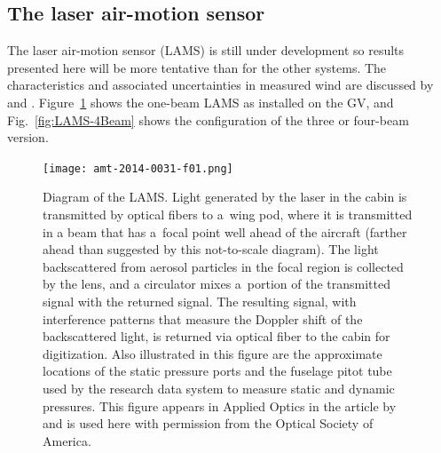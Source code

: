 \documentclass[12pt,twoside,english]{article}\usepackage[]{graphicx}\usepackage[]{color}
\let\OrgIndex\index
\renewcommand*{\index}[1]{\OrgIndex{#1}}
\begin{document}
\subsection{The laser air-motion sensor\label{sub:LAMS-description}}

The laser air-motion sensor (LAMS) is still under development so results presented here will be more tentative than for the other systems. The characteristics and associated uncertainties in measured wind are discussed by \citet{SpulerEtAl2011} and \citet{CooperEtAl2014}. Figure~\ref{fig:LAMSschematic} shows the one-beam LAMS as installed on the GV, and Fig.~\ref{fig:LAMS-4Beam} shows the configuration of the three or four-beam version.

\begin{figure}%
\noindent \begin{centering}%
\texttt{[image: amt-2014-0031-f01.png]}%
\caption[Diagram showing the LAMS as operated on the GV.]{Diagram of the LAMS. Light generated by the laser in the cabin is transmitted by optical fibers to a~wing pod, where it is transmitted in a beam that has a~focal point well ahead of the aircraft (farther ahead than suggested by this not-to-scale diagram). The light backscattered from aerosol particles in the focal region is collected by the lens, and a circulator mixes a~portion of the transmitted signal with the returned signal. The resulting signal, with interference patterns that measure the Doppler shift of the backscattered light, is returned via optical fiber to the cabin for digitization. Also illustrated in this figure are the approximate locations of the static pressure ports and the fuselage pitot tube used by the research data system to measure static and dynamic pressures. This figure appears in Applied Optics in the article by \citet{SpulerEtAl2011} and is used here with permission from the Optical Society of America.\label{fig:LAMSschematic}}%
\end{centering}%
\end{figure}%
\end{document}
